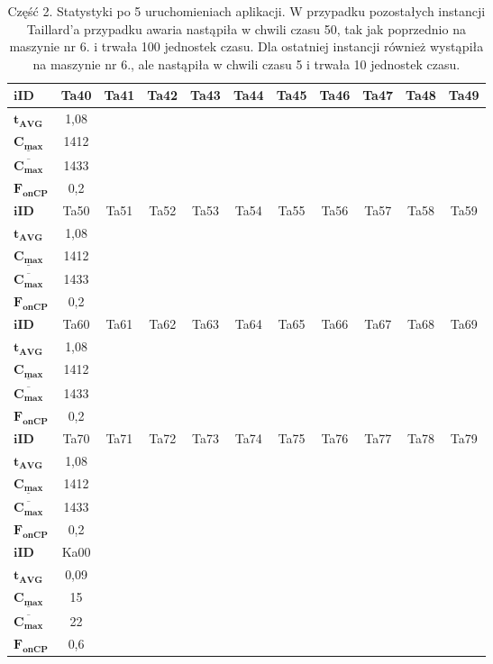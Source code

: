 \documentclass[printmode,oneside]{mgr}
\begin{document}
\begin{table}[ht]
\renewcommand{\arraystretch}{1.2}
\begin{tabularx}{\textwidth}{|X|c|c|c|c|c|c|c|c|c|c|}
\hline
$\mathbf{iID}$ & Ta40 & Ta41 & Ta42 & Ta43 & Ta44 & Ta45 & Ta46 & Ta47 & Ta48 & Ta49\\
\hline
$\mathbf{t_{AVG}}$ & 1,08 &  &  &  &  &  &  &  &  & \\
\hline
$\mathbf{\underline{C_{max}}}$ & 1412 &  &  &  &  &  &  &  &  & \\
\hline
$\mathbf{\overline{C_{max}}}$ & 1433 &  &  &  &  &  &  &  &  & \\
\hline
$\mathbf{F_{onCP}}$ & 0,2 &  &  &  &  &  &  &  &  & \\
\hline
\hline
$\mathbf{iID}$ & Ta50 & Ta51 & Ta52 & Ta53 & Ta54 & Ta55 & Ta56 & Ta57 & Ta58 & Ta59\\
\hline
$\mathbf{t_{AVG}}$ & 1,08 &  &  &  &  &  &  &  &  & \\
\hline
$\mathbf{\underline{C_{max}}}$ & 1412 &  &  &  &  &  &  &  &  & \\
\hline
$\mathbf{\overline{C_{max}}}$ & 1433 &  &  &  &  &  &  &  &  & \\
\hline
$\mathbf{F_{onCP}}$ & 0,2 &  &  &  &  &  &  &  &  & \\
\hline
\hline
$\mathbf{iID}$ & Ta60 & Ta61 & Ta62 & Ta63 & Ta64 & Ta65 & Ta66 & Ta67 & Ta68 & Ta69\\
\hline
$\mathbf{t_{AVG}}$ & 1,08 &  &  &  &  &  &  &  &  & \\
\hline
$\mathbf{\underline{C_{max}}}$ & 1412 &  &  &  &  &  &  &  &  & \\
\hline
$\mathbf{\overline{C_{max}}}$ & 1433 &  &  &  &  &  &  &  &  & \\
\hline
$\mathbf{F_{onCP}}$ & 0,2 &  &  &  &  &  &  &  &  & \\
\hline
\hline
$\mathbf{iID}$ & Ta70 & Ta71 & Ta72 & Ta73 & Ta74 & Ta75 & Ta76 & Ta77 & Ta78 & Ta79\\
\hline
$\mathbf{t_{AVG}}$ & 1,08 &  &  &  &  &  &  &  &  & \\
\hline
$\mathbf{\underline{C_{max}}}$ & 1412 &  &  &  &  &  &  &  &  & \\
\hline
$\mathbf{\overline{C_{max}}}$ & 1433 &  &  &  &  &  &  &  &  & \\
\hline
$\mathbf{F_{onCP}}$ & 0,2 &  &  &  &  &  &  &  &  & \\
\hline
\hline
$\mathbf{iID}$ & Ka00\\
\hline
$\mathbf{t_{AVG}}$ & 0,09\\
\hline
$\mathbf{\underline{C_{max}}}$ & 15\\
\hline
$\mathbf{\overline{C_{max}}}$ & 22\\
\hline
$\mathbf{F_{onCP}}$ & 0,6\\
\hline
\end{tabularx}
\caption{Część 2. Statystyki po 5 uruchomieniach aplikacji. W przypadku pozostałych instancji Taillard'a przypadku awaria nastąpiła w chwili czasu 50, tak jak poprzednio na maszynie nr 6. i trwała 100 jednostek czasu. Dla ostatniej instancji również wystąpiła na maszynie nr 6., ale nastąpiła w chwili czasu 5 i trwała 10 jednostek czasu.}
\label{tab_res_two}
\renewcommand{\arraystretch}{1.0}
\end{table}
\end{document}
